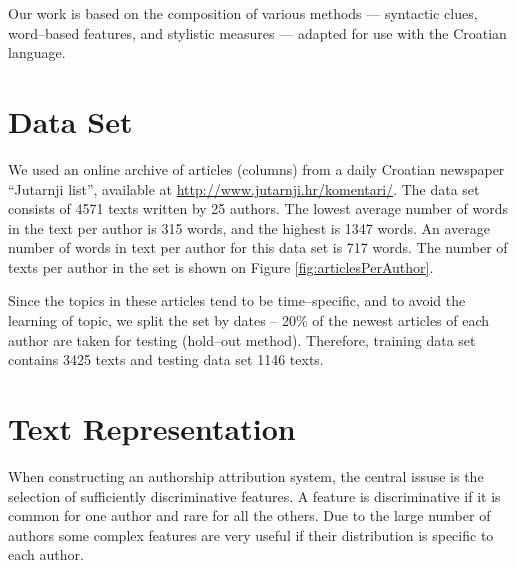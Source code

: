 \documentclass{llncs}
\begin{document}
Our work is based on the composition of various methods --- syntactic clues, word--based features, 
and stylistic measures --- adapted for use with the Croatian language. 

\section{Data Set}
\label{sec:podatci}
We used an online archive of articles (columns) from a daily Croatian newspaper ``Jutarnji
list'', available at \url{http://www.jutarnji.hr/komentari/}. The data set
consists of 4571 texts written by 25 authors. The lowest average number of words
in the text per author is 315 words, and the highest is 1347 words. An average number
of words in text per author for this data set is 717 words. The number of texts per
author in the set is shown on Figure \ref{fig:articlesPerAuthor}.

Since the topics in these articles tend to be time--specific, and to avoid the learning of topic, 
we split the set by dates -- 20\% of the newest articles of
each author are taken for testing (hold--out method). Therefore, training data
set contains 3425 texts and testing data set 1146 texts.

\begin{minipage}{0.8\linewidth}
\vspace{10pt}
\centerline{\resizebox{0.7\linewidth}{!}{}}%
%
\label{fig:articlesPerAuthor}
\end{minipage}

\section{Text Representation}
When constructing an authorship attribution system, the central issuse is the selection of 
sufficiently discriminative features. A feature is discriminative if it is common for one author 
and rare for all the others. Due to the large number of authors some complex features are very useful if their
distribution is specific to each author. %

\end{document}
